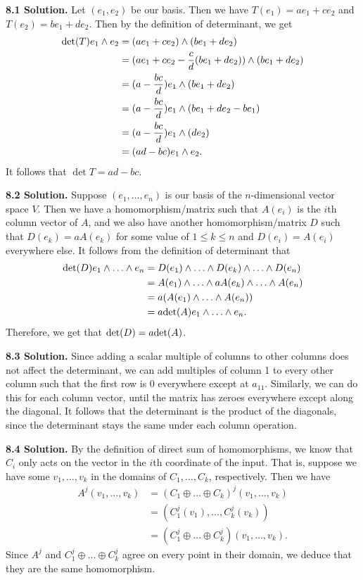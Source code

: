 \textbf{8.1 Solution.} Let $(e_1, e_2)$ be our basis. Then we have $T(e_1) = ae_1 + ce_2$ and $T(e_2) = be_1 + de_2$. Then by the definition of determinant, we get
\begin{align*}
    \text{det}(T)e_1 \wedge e_2 &= (ae_1 + ce_2) \wedge (be_1 + de_2) \\
    &= (ae_1 + ce_2 - \frac{c}{d}(be_1 + de_2)) \wedge (be_1 + de_2) \\
    &= (a - \frac{bc}{d})e_1 \wedge (be_1 + de_2) \\
    &= (a - \frac{bc}{d})e_1 \wedge (be_1 + de_2 - be_1) \\
    &= (a - \frac{bc}{d})e_1 \wedge (de_2) \\
    &= (ad - bc)e_1 \wedge e_2.
\end{align*}
It follows that $\det{T} = ad - bc$.

\textbf{8.2 Solution.} Suppose $(e_1, \dots, e_n)$ is our basis of the $n$-dimensional vector space $V$. Then we have a homomorphism/matrix such that $A(e_i)$ is the $i$th column vector of $A$, and we also have another homomorphism/matrix $D$ such that $D(e_k) = aA(e_k)$ for some value of $1 \leq k \leq n$ and $D(e_i) = A(e_i)$ everywhere else. It follows from the definition of determinant that
\begin{align*}
    \f{det}(D)e_1 \^ \dots \^ e_n &= D(e_1) \^ \dots \^ D(e_k) \^ \dots \^ D(e_n) \\
    &= A(e_1) \^ \dots \^ aA(e_k) \^ \dots \^ A(e_n) \\
    &= a(A(e_1) \^ \dots \^ A(e_n)) \\
    &= a\f{det}(A)e_1 \^ \dots \^ e_n.
\end{align*}
Therefore, we get that $\text{det}(D) = a\text{det}(A)$.

\textbf{8.3 Solution.} Since adding a scalar multiple of columns to other columns does not affect the determinant, we can add multiples of column 1 to every other column such that the first row is 0 everywhere except at $a_{11}$. Similarly, we can do this for each column vector, until the matrix has zeroes everywhere except along the diagonal. It follows that the determinant is the product of the diagonals, since the determinant stays the same under each column operation.

\textbf{8.4 Solution.} By the definition of direct sum of homomorphisms, we know that $C_i$ only acts on the vector in the $i$th coordinate of the input. That is, suppose we have some $v_1, \dots, v_k$ in the domains of $C_1, \dots, C_k$, respectively. Then we have
\begin{align*}
    A^j(v_1, \dots, v_k) &= (C_1 \oplus \dots \oplus C_k)^j(v_1, \dots, v_k) \\
    &= (C_1^j(v_1), \dots, C_k^j(v_k)) \\
    &= (C_1^j \oplus \dots \oplus C_k^j)(v_1, \dots, v_k).
\end{align*}
Since $A^j$ and $C_1^j \oplus \dots \oplus C_k^j$ agree on every point in their domain, we deduce that they are the same homomorphism.

